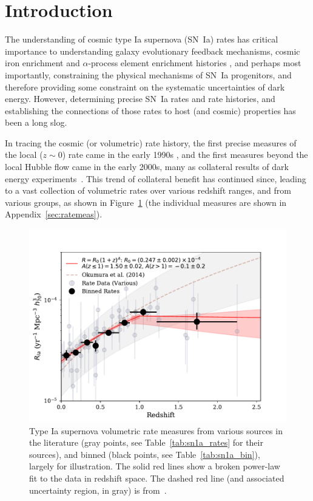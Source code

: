 \documentclass[apj, twocolumn]{aastex62}
\begin{document}
\section{Introduction}
The understanding of cosmic type Ia supernova (SN~Ia) rates has critical importance to understanding galaxy evolutionary feedback mechanisms, cosmic iron enrichment and $\alpha$-process element enrichment histories \citep[see][]{Maoz:2017ck}, and perhaps most importantly, constraining the physical mechanisms of SN~Ia progenitors, and therefore providing some constraint on the systematic uncertainties of dark energy. However, determining precise SN~Ia rates and rate histories, and establishing the connections of those rates to host (and cosmic) properties has been a long slog. 

In tracing the cosmic (or volumetric) rate history, the first precise measures of the local ($z\sim0$) rate came in the early 1990s \cite[cf.][]{Cappellaro:1993qm,Cappellaro:1999}, and the first measures beyond the local Hubble flow came in the early 2000s, many as collateral results of dark energy experiments~\citep{Riess:1998,Perlmutter:1999}. This trend of collateral benefit has continued since, leading to a vast collection of volumetric rates over various redshift ranges, and from various groups, as shown in Figure~\ref{fig:sn1a_rates} (the individual measures are shown in Appendix~\ref{sec:ratemeas}). 

\begin{figure}[t]
   \centering
   \includegraphics[width=6.1in]{figure_SNIa_rate_z_pwr_fit.pdf}
   \caption{\footnotesize Type Ia supernova volumetric rate measures from various sources in the literature (gray points, see Table~\ref{tab:sn1a_rates} for their sources), and binned (black points, see Table~\ref{tab:sn1a_bin}), largely for illustration. The solid red lines show a broken power-law fit to the data in redshift space. The dashed red line (and associated uncertainty region, in gray) is from~\cite{Okumura:2014}.}
   \label{fig:sn1a_rates}
\end{figure}
\end{document}
